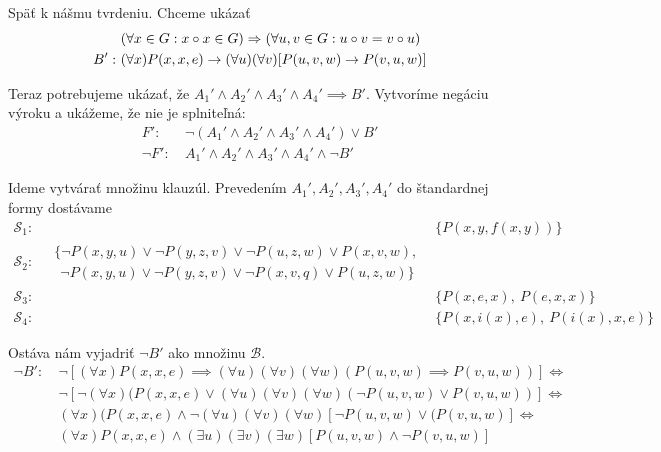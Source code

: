\begin{priklad}
    Späť k nášmu tvrdeniu. Chceme ukázať
    \begin{align*}
        &(\forall x \in G : x \circ x \in G) \Rightarrow
            (\forall u,v \in G: u \circ v = v \circ u) \\
        B':\ & (\forall x) P(x,x,e) \rightarrow  
            (\forall u) (\forall v) [P(u,v,w) \rightarrow P(v,u,w)]
    \end{align*}

    Teraz potrebujeme ukázať, že
    $A_1' \land A_2' \land A_3' \land  A_4' \implies B'$.
    Vytvoríme negáciu výroku a ukážeme, že nie je splniteľná:
    \begin{align*}
        F':\ & \neg (A_1' \land A_2' \land A_3' \land A_4') \lor B' \\
      \neg F':\ & A_1' \land A_2' \land A_3' \land A_4' \land \neg B'
    \end{align*}

    Ideme vytvárať množinu klauzúl. Prevedením $A_1', A_2', A_3', A_4'$ do
    štandardnej formy dostávame
    \begin{align*}
        \mathscr{S}_1:\ & \Big\{ P(x,y,f(x,y)) \Big\} \\
        \mathscr{S}_2:\ 
            \begin{split}
                 &\Big\{ \neg P(x,y,u) \lor \neg P(y,z,v)
                    \lor \neg P(u,z,w) \lor P(x,v,w), \\
                 &\ \ \neg P(x,y,u)\lor \neg P(y,z,v) \lor \neg P(x,v,q)
                    \lor P(u,z,w) \Big\}
            \end{split} \\
        \mathscr{S}_3:\ & \Big\{ P(x,e,x), \ P(e,x,x) \Big\} \\
        \mathscr{S}_4:\ & \Big\{ P(x,i(x),e), \ P(i(x),x,e) \Big\}
    \end{align*}

    Ostáva nám vyjadriť $\neg B'$ ako množinu $\mathscr{B}$.
    \begin{align*}
        \neg B':\ &
            \neg [(\forall x) P(x,x,e) \implies
                    (\forall u) (\forall v)(\forall w)(P(u,v,w) \implies
                    P(v,u,w))] \iff \\
        & \neg [ \neg (\forall x) (P(x,x,e)
                \lor (\forall u) (\forall v) (\forall w)
                    (\neg P(u,v,w) \lor P(v,u,w))] \iff \\
        &(\forall x) (P(x,x,e) \land \neg (\forall u)(\forall v) (\forall w) 
          [\neg P(u,v,w) \lor (P(v,u,w)] \iff \\
        & (\forall x) P(x,x,e)
            \land (\exists u) (\exists v) (\exists w)
                    [P(u,v,w)\land \neg P(v,u,w)]
    \end{align*}


\end{priklad}
